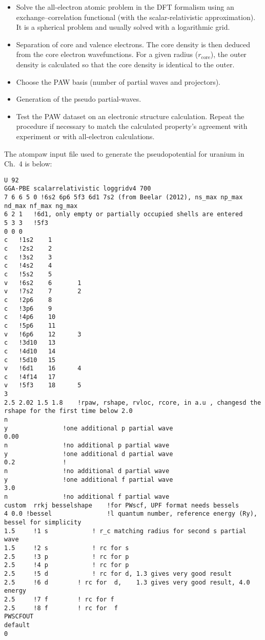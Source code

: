 \begin{itemize}
	\item Solve the all-electron atomic problem in the DFT formalism using an exchange--correlation functional (with the scalar-relativistic approximation). It is a spherical problem and usually solved with a logarithmic grid.
	\item Separation of core and valence electrons. The core density is then deduced from the core electron wavefunctions. For a given radius ($r_{\text{core}}$), the outer density is calculated so that the core density is identical to the outer.
	\item Choose the PAW basis (number of partial waves and projectors).
	\item Generation of the pseudo partial-waves.
	\item Test the PAW dataset on an electronic structure calculation. Repeat the procedure if necessary to match the calculated property's agreement with experiment or with all-electron calculations.
\end{itemize}




\pagebreak
The atompaw input file used to generate the pseudopotential for uranium in Ch.~4 is below:
\lstset{style=atpw}
\begin{lstlisting}
U 92
GGA-PBE	scalarrelativistic loggridv4 700 
7 6 6 5 0 !6s2 6p6 5f3 6d1 7s2 (from Beelar (2012), ns_max np_max nd_max nf_max ng_max
6 2 1	!6d1, only empty or partially occupied shells are entered
5 3 3	!5f3
0 0 0
c	!1s2	1	
c	!2s2	2
c	!3s2	3
c	!4s2	4
c	!5s2	5
v	!6s2	6		1
v	!7s2	7		2
c	!2p6	8
c	!3p6	9
c	!4p6	10
c	!5p6	11		
v	!6p6	12		3
c	!3d10	13
c	!4d10	14
c	!5d10	15
v	!6d1	16		4
c	!4f14	17
v	!5f3	18		5
3
2.5 2.02 1.5 1.8	!rpaw, rshape, rvloc, rcore, in a.u , changesd the rshape for the first time below 2.0
n
y				!one additional p partial wave
0.00
n				!no additional p partial wave
y				!one additional d partial wave
0.2				!
n				!no additional d partial wave
y				!one additional f partial wave
3.0
n				!no additional f partial wave
custom  rrkj besselshape    !for PWscf, UPF format needs bessels        
4 0.0 !bessel     			!l quantum number, reference energy (Ry), bessel for simplicity
1.5		!1 s			! r_c matching radius for second s partial wave
1.5		!2 s			! rc for s
2.5		!3 p			! rc for p
2.5		!4 p			! rc for p
2.5		!5 d	        ! rc for d, 1.3 gives very good result
2.5		!6 d        ! rc for  d,	1.3 gives very good result, 4.0 energy
2.5		!7 f        ! rc for f
2.5		!8 f        ! rc for  f
PWSCFOUT
default
0

\end{lstlisting}


